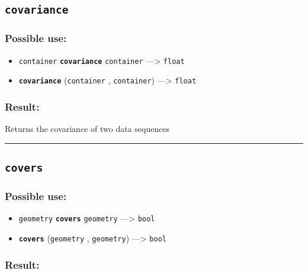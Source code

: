\documentclass[]{book}
\providecommand{\tightlist}{%
  \setlength{\itemsep}{0pt}\setlength{\parskip}{0pt}}
\theoremstyle{definition}
\theoremstyle{definition}
\theoremstyle{definition}
\theoremstyle{remark}
\begin{document}
\subsection{\texorpdfstring{\texttt{covariance}}{covariance}}\label{covariance}

\subsubsection{Possible use:}\label{possible-use-113}

\begin{itemize}
\tightlist
\item
  \texttt{container} \textbf{\texttt{covariance}} \texttt{container}
  ---\textgreater{} \texttt{float}
\item
  \textbf{\texttt{covariance}} (\texttt{container} , \texttt{container})
  ---\textgreater{} \texttt{float}
\end{itemize}

\subsubsection{Result:}\label{result-110}

Returns the covariance of two data sequences

\begin{center}\rule{0.5\linewidth}{\linethickness}\end{center}

\subsection{\texorpdfstring{\texttt{covers}}{covers}}\label{covers}

\subsubsection{Possible use:}\label{possible-use-114}

\begin{itemize}
\tightlist
\item
  \texttt{geometry} \textbf{\texttt{covers}} \texttt{geometry}
  ---\textgreater{} \texttt{bool}
\item
  \textbf{\texttt{covers}} (\texttt{geometry} , \texttt{geometry})
  ---\textgreater{} \texttt{bool}
\end{itemize}

\subsubsection{Result:}\label{result-111}
\end{document}
